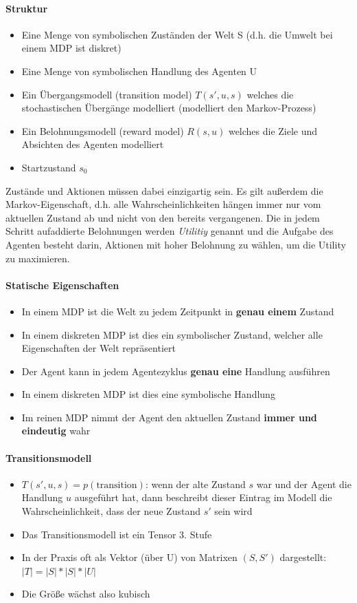 \paragraph{Struktur}
\begin{itemize}
\item Eine Menge von symbolischen Zust\"anden der Welt S (d.h. die Umwelt bei einem MDP ist diskret)
\item Eine Menge von symbolischen Handlung des Agenten U
\item Ein \"Ubergangsmodell (transition model) $T(s', u, s)$ welches die stochastischen \"Uberg\"ange modelliert (modelliert den Markov-Prozess)
\item Ein Belohnungsmodell (reward model) $R(s,u)$ welches die Ziele und Absichten des Agenten modelliert
\item Startzustand $s_0$
\end{itemize}
Zust\"ande und Aktionen m\"ussen dabei einzigartig sein.
Es gilt au{\ss}erdem die Markov-Eigenschaft, d.h. alle Wahrscheinlichkeiten h\"angen immer nur vom aktuellen Zustand ab und nicht von den bereits vergangenen.
Die in jedem Schritt aufaddierte Belohnungen werden \emph{Utilitiy} genannt und die Aufgabe des Agenten besteht darin, Aktionen mit hoher Belohnung zu w\"ahlen, um die Utility zu maximieren.

\paragraph{Statische Eigenschaften}
\begin{itemize}
	\item In einem MDP ist die Welt zu jedem Zeitpunkt in \textbf{genau einem} Zustand
	\item In einem diskreten MDP ist dies ein symbolischer Zustand, welcher alle Eigenschaften der Welt repr\"asentiert
	\item Der Agent kann in jedem Agentezyklus \textbf{genau eine} Handlung ausf\"uhren
	\item In einem diskreten MDP ist dies eine symbolische Handlung
	\item Im reinen MDP nimmt der Agent den aktuellen Zustand \textbf{immer und eindeutig} wahr
\end{itemize}

\paragraph{Transitionsmodell}
\begin{itemize}
	\item $T(s', u, s) = p(\text{transition})$: wenn der alte Zustand $s$ war und der Agent die Handlung $u$ ausgef\"uhrt hat, dann beschreibt dieser Eintrag im Modell die Wahrscheinlichkeit, dass der neue Zustand $s'$ sein wird
	\item Das Transitionsmodell ist ein Tensor 3. Stufe
	\item In der Praxis oft als Vektor (\"uber U) von Matrixen $(S, S')$ dargestellt: $|T| = |S| * |S| * |U|$
	\item Die Gr\"o{\ss}e w\"achst also kubisch
\end{itemize}


